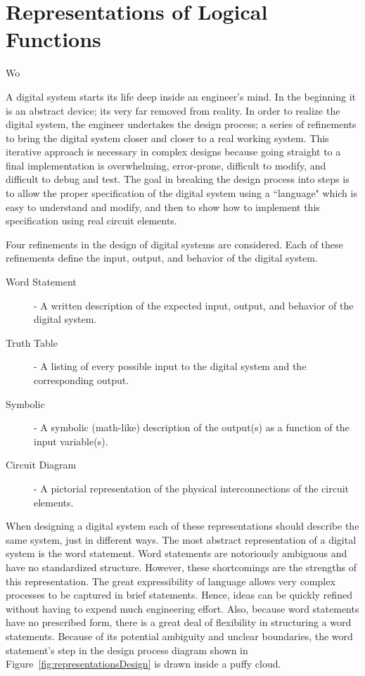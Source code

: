 \chapter{Representations of Logical Functions}Wo
\label{chapter:Representations of Logical Functions}
\graphicspath{ {./chapter02/Fig} }

A digital system starts its life deep inside an engineer's mind.  
In the beginning it is an abstract device; its very far removed 
from reality.  In order to realize the digital system, the engineer
undertakes the design process; a series of refinements to bring
the digital system closer and closer to a real working system.  This 
iterative approach is necessary in complex designs because going straight
to a final implementation is overwhelming, error-prone, difficult
to modify, and difficult to debug and test.  The goal in breaking the 
design process into steps is to allow the proper specification of the
digital system using a ``language" which is easy to understand and modify,
and then to show how to implement this specification using real circuit 
elements. 

Four refinements in the design of digital systems are 
considered.  Each of these refinements define the input, output, and 
behavior of the digital system.  

\begin{description}
\item [Word Statement] - A written description of the expected 
	input, output, and behavior of the digital system.
\item [Truth Table] -  A listing of every possible input to the
	digital system and the corresponding output.  
\item [Symbolic] - A symbolic (math-like) description of the 
	output(s) as a function of the input variable(s).
\item [Circuit Diagram] - A pictorial representation of the 
	physical interconnections of the circuit elements.
\end{description}

When designing a digital system each of these representations should
describe the same system, just in different ways.  The most abstract 
representation of a digital system is the word statement.  Word 
statements are notoriously ambiguous and have no standardized structure.  
However, these shortcomings are the strengths of this representation. The great
expressibility of language allows very complex processes to be captured 
in brief statements.  Hence, ideas can be quickly refined 
without having to expend much engineering effort.  Also, because 
word statements have no prescribed form, there is a great deal 
of flexibility in structuring a word statements.  Because of its
potential ambiguity and unclear boundaries, the word statement's step 
in the design process diagram shown in Figure~\ref{fig:representationsDesign} is 
drawn inside a puffy cloud.

